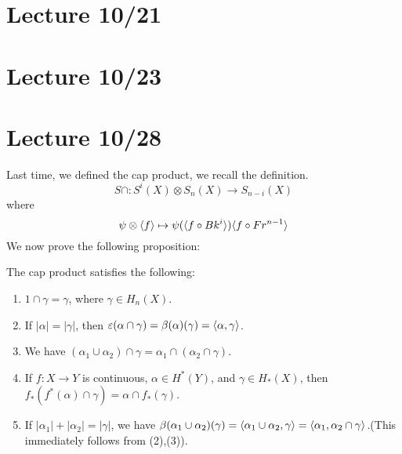 \section{Lecture 10/21}



\section{Lecture 10/23}


\section{Lecture 10/28}
Last time, we defined the cap product, we recall the definition.
\begin{equation*}
    S\cap: S^i(X)\otimes S_n(X)\to S_{n-i}(X)
\end{equation*}
where 
\begin{equation*}
    \psi\otimes\langle f\rangle\mapsto \psi(\langle f\circ Bk^i\rangle)\langle f\circ Fr^{n-1}\rangle
\end{equation*}
We now prove the following proposition:
\begin{prop}
    The cap product satisfies the following:
    \begin{enumerate}
        \item $1\cap\gamma=\gamma$, where $\gamma\in H_n(X)$.
        \item If $|\alpha|=|\gamma|$, then $\varepsilon(\alpha\cap\gamma)=\beta(\alpha)(\gamma)=\langle\alpha,\gamma\rangle$.
        \item We have $(\alpha_1\cup\alpha_2)\cap\gamma=\alpha_1\cap(\alpha_2\cap\gamma)$.
        \item If $f:X\to Y$ is continuous, $\alpha\in H^*(Y)$, and $\gamma\in H_*(X)$, then $f_*(f^*(\alpha)\cap\gamma)=\alpha\cap f_*(\gamma)$.
        \item If $|\alpha_1|+|\alpha_2|=|\gamma|$, we have $\beta(\alpha_1\cup\alpha_2)(\gamma)=\langle\alpha_1\cup\alpha_2,\gamma\rangle=\langle \alpha_1,\alpha_2\cap\gamma\rangle$.(This immediately follows from (2),(3)).
    \end{enumerate}
\end{prop}
